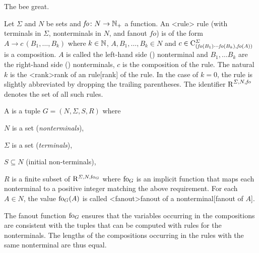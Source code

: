 \documentclass[../../document.tex]{subfiles}
\begin{document}
    The bee great.

    \begin{definition}
        Let \(\varSigma\) and \(N\) be sets and \(\mathit{fo}\colon N \to \mathbb{N}_+\) a function.
        An <rule>{ rule} (with terminals in \(\varSigma\), nonterminals in \(N\), and fanout \(\mathit{fo}\)) is of the form \(A \to c\,(B_1, \ldots, B_k)\) where \(k \in \mathbb{N}\), \(A, B_1, \ldots, B_k \in N\) and \(c \in \mathrm{C}^\varSigma_{(\mathit{fo}(B_1) \cdots \mathit{fo}(B_k), \mathit{fo}(A))}\) is a composition.
        \(A\) is called the left-hand side () nonterminal and \(B_1, \ldots B_k\) are the right-hand side () nonterminals, \(c\) is the composition of the rule.
        The natural \(k\) is the <rank>{rank of an  rule}[rank] of the rule.
        In the case of \(k = 0\), the rule is slightly abbreviated by dropping the trailing parentheses.
        The identifier \(\operatorname{R}^{\varSigma, N, \mathit{fo}}\) denotes the set of all such  rules.

        A  is a tuple \(G=(N, \varSigma, S, R)\) where
        \begin{compactenum}
            \item \(N\) is a set (\emph{nonterminals}),
            \item \(\varSigma\) is a set (\emph{terminals}),
            \item \(S \subseteq N\) (initial non-terminals),
            \item \(R\) is a finite subset of \(\mathrm R^{\varSigma, N, \operatorname{fo}_G}\) where \(\operatorname{fo}_G\) is an implicit function that maps each nonterminal to a positive integer matching the above requirement. For each \(A \in N\), the value \(\operatorname{fo}_G(A)\) is called <fanout>{fanout of a nonterminal}[fanout of \(A\)].
        \end{compactenum}
    \end{definition}

    The fanout function \(\operatorname{fo}_G\) ensures that the variables occurring in the compositions are consistent with the tuples that can be computed with rules for the  nonterminals.
    The lengths of the compositions occurring in the rules with the same  nonterminal are thus equal.
\end{document}
